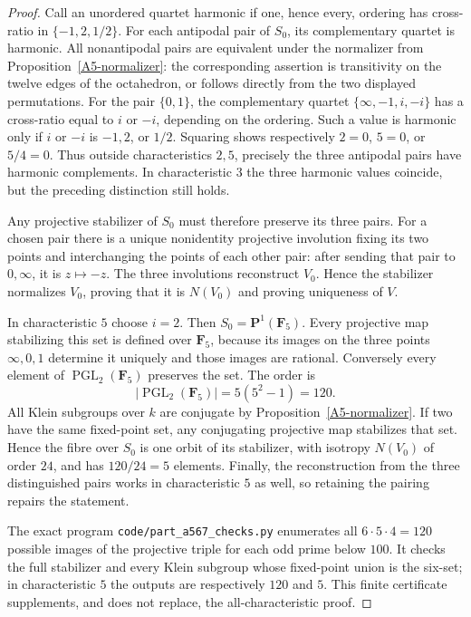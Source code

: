 \begin{proof}
Call an unordered quartet harmonic if one, hence every, ordering has cross-ratio in $\{-1,2,1/2\}$. For each antipodal pair of $S_0$, its complementary quartet is harmonic. All nonantipodal pairs are equivalent under the normalizer from Proposition~\ref{A5-normalizer}: the corresponding assertion is transitivity on the twelve edges of the octahedron, or follows directly from the two displayed permutations. For the pair $\{0,1\}$, the complementary quartet $\{\infty,-1,i,-i\}$ has a cross-ratio equal to $i$ or $-i$, depending on the ordering. Such a value is harmonic only if $i$ or $-i$ is $-1,2$, or $1/2$. Squaring shows respectively $2=0$, $5=0$, or $5/4=0$. Thus outside characteristics $2,5$, precisely the three antipodal pairs have harmonic complements. In characteristic $3$ the three harmonic values coincide, but the preceding distinction still holds.

Any projective stabilizer of $S_0$ must therefore preserve its three pairs. For a chosen pair there is a unique nonidentity projective involution fixing its two points and interchanging the points of each other pair: after sending that pair to $0,\infty$, it is $z\mapsto-z$. The three involutions reconstruct $V_0$. Hence the stabilizer normalizes $V_0$, proving that it is $N(V_0)$ and proving uniqueness of $V$.

In characteristic $5$ choose $i=2$. Then $S_0=\mathbf P^1(\mathbf F_5)$. Every projective map stabilizing this set is defined over $\mathbf F_5$, because its images on the three points $\infty,0,1$ determine it uniquely and those images are rational. Conversely every element of $\operatorname{PGL}_2(\mathbf F_5)$ preserves the set. The order is
\[
 |\operatorname{PGL}_2(\mathbf F_5)|=5(5^2-1)=120.
\]
All Klein subgroups over $k$ are conjugate by Proposition~\ref{A5-normalizer}. If two have the same fixed-point set, any conjugating projective map stabilizes that set. Hence the fibre over $S_0$ is one orbit of its stabilizer, with isotropy $N(V_0)$ of order $24$, and has $120/24=5$ elements. Finally, the reconstruction from the three distinguished pairs works in characteristic $5$ as well, so retaining the pairing repairs the statement.

The exact program \texttt{code/part\_a567\_checks.py} enumerates all $6\cdot5\cdot4=120$ possible images of the projective triple for each odd prime below $100$. It checks the full stabilizer and every Klein subgroup whose fixed-point union is the six-set; in characteristic $5$ the outputs are respectively $120$ and $5$. This finite certificate supplements, and does not replace, the all-characteristic proof.
\end{proof}

